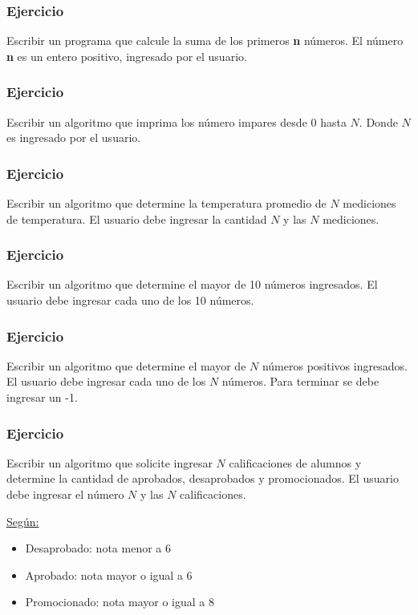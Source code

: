 \subsubsection{Ejercicio}
Escribir un programa que calcule la suma de los primeros \textbf{n} números. El número \textbf{n} es un entero positivo, ingresado por el usuario.

\subsubsection{Ejercicio}
Escribir un algoritmo que imprima los número impares desde 0 hasta $N$. Donde $N$ es ingresado por el usuario.

\subsubsection{Ejercicio}
Escribir un algoritmo que determine la temperatura promedio de $N$ mediciones de temperatura. El usuario debe ingresar la cantidad $N$ y las $N$ mediciones. 

\subsubsection{Ejercicio}
Escribir un algoritmo que determine el mayor de 10 números ingresados. El usuario debe ingresar cada uno de los 10 números.

\subsubsection{Ejercicio}
Escribir un algoritmo que determine el mayor de $N$ números positivos ingresados. El usuario debe ingresar cada uno de los $N$ números. Para terminar se debe ingresar un -1.

\subsubsection{Ejercicio}
Escribir un algoritmo que solicite ingresar $N$ calificaciones de alumnos y determine la cantidad de aprobados, desaprobados y promocionados. 
El usuario debe ingresar el número $N$ y las $N$ calificaciones.

\underline{Según:}
\begin{itemize}
  \item Desaprobado: nota menor a 6
  \item Aprobado: nota mayor o igual a 6
  \item Promocionado: nota mayor o igual a 8
\end{itemize}

